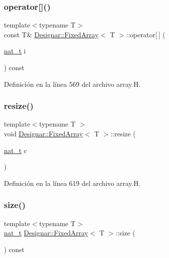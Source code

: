\subsubsection{\texorpdfstring{operator[]()}{operator[]()}\hspace{0.1cm}{\footnotesize\ttfamily [2/2]}}
{\footnotesize\ttfamily template$<$typename T$>$ \\
const T\& \hyperlink{class_designar_1_1_fixed_array}{Designar\+::\+Fixed\+Array}$<$ T $>$\+::operator\mbox{[}$\,$\mbox{]} (\begin{DoxyParamCaption}\item[{\hyperlink{namespace_designar_aa72662848b9f4815e7bf31a7cf3e33d1}{nat\+\_\+t}}]{i }\end{DoxyParamCaption}) const\hspace{0.3cm}{\ttfamily [inline]}}



Definición en la línea 569 del archivo array.\+H.

\mbox{\label{class_designar_1_1_fixed_array_af52fca1277e52d28ce6d46ed4a7b471e}} 
\subsubsection{\texorpdfstring{resize()}{resize()}}
{\footnotesize\ttfamily template$<$typename T $>$ \\
void \hyperlink{class_designar_1_1_fixed_array}{Designar\+::\+Fixed\+Array}$<$ T $>$\+::resize (\begin{DoxyParamCaption}\item[{\hyperlink{namespace_designar_aa72662848b9f4815e7bf31a7cf3e33d1}{nat\+\_\+t}}]{c }\end{DoxyParamCaption})}



Definición en la línea 619 del archivo array.\+H.

\mbox{\label{class_designar_1_1_fixed_array_a03ce71d0cc8f4155f117bbfe83bb95e8}} 
\subsubsection{\texorpdfstring{size()}{size()}}
{\footnotesize\ttfamily template$<$typename T$>$ \\
\hyperlink{namespace_designar_aa72662848b9f4815e7bf31a7cf3e33d1}{nat\+\_\+t} \hyperlink{class_designar_1_1_fixed_array}{Designar\+::\+Fixed\+Array}$<$ T $>$\+::size (\begin{DoxyParamCaption}{ }\end{DoxyParamCaption}) const\hspace{0.3cm}{\ttfamily [inline]}}



